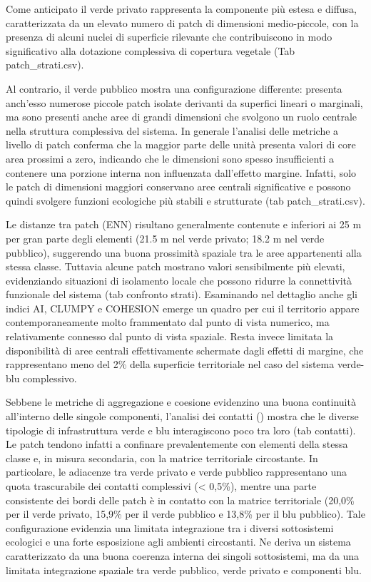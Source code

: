 \documentclass[
  a4paper,
]{book}
\begin{document}
Come anticipato il verde privato rappresenta la componente più estesa e diffusa, caratterizzata da un elevato numero di patch di dimensioni medio-piccole, con la presenza di alcuni nuclei di superficie rilevante che contribuiscono in modo significativo alla dotazione complessiva di copertura vegetale (Tab patch\_strati.csv).

Al contrario, il verde pubblico mostra una configurazione differente: presenta anch'esso numerose piccole patch isolate derivanti da superfici lineari o marginali, ma sono presenti anche aree di grandi dimensioni che svolgono un ruolo centrale nella struttura complessiva del sistema.
In generale l'analisi delle metriche a livello di patch conferma che la maggior parte delle unità presenta valori di core area prossimi a zero, indicando che le dimensioni sono spesso insufficienti a contenere una porzione interna non influenzata dall'effetto margine.
Infatti, solo le patch di dimensioni maggiori conservano aree centrali significative e possono quindi svolgere funzioni ecologiche più stabili e strutturate (tab patch\_strati.csv).

Le distanze tra patch (ENN) risultano generalmente contenute e inferiori ai 25 m per gran parte degli elementi (21.5 m nel verde privato; 18.2 m nel verde pubblico), suggerendo una buona prossimità spaziale tra le aree appartenenti alla stessa classe.
Tuttavia alcune patch mostrano valori sensibilmente più elevati, evidenziando situazioni di isolamento locale che possono ridurre la connettività funzionale del sistema (tab confronto strati).
Esaminando nel dettaglio anche gli indici AI, CLUMPY e COHESION emerge un quadro per cui il territorio appare contemporaneamente molto frammentato dal punto di vista numerico, ma relativamente connesso dal punto di vista spaziale.
Resta invece limitata la disponibilità di aree centrali effettivamente schermate dagli effetti di margine, che rappresentano meno del 2\% della superficie territoriale nel caso del sistema verde-blu complessivo.

Sebbene le metriche di aggregazione e coesione evidenzino una buona continuità all'interno delle singole componenti, l'analisi dei contatti () mostra che le diverse tipologie di infrastruttura verde e blu interagiscono poco tra loro (tab contatti).
Le patch tendono infatti a confinare prevalentemente con elementi della stessa classe e, in misura secondaria, con la matrice territoriale circostante.
In particolare, le adiacenze tra verde privato e verde pubblico rappresentano una quota trascurabile dei contatti complessivi (\textless{} 0,5\%), mentre una parte consistente dei bordi delle patch è in contatto con la matrice territoriale (20,0\% per il verde privato, 15,9\% per il verde pubblico e 13,8\% per il blu pubblico).
Tale configurazione evidenzia una limitata integrazione tra i diversi sottosistemi ecologici e una forte esposizione agli ambienti circostanti.
Ne deriva un sistema caratterizzato da una buona coerenza interna dei singoli sottosistemi, ma da una limitata integrazione spaziale tra verde pubblico, verde privato e componenti blu.
\end{document}
